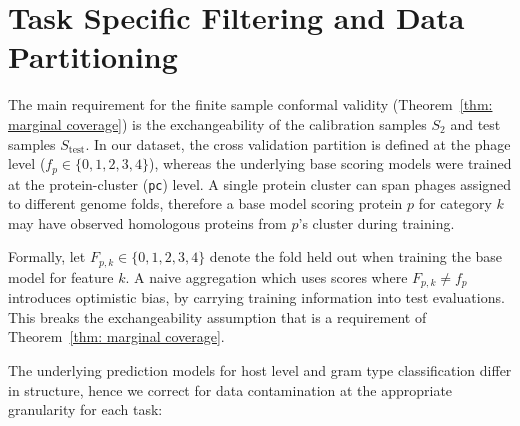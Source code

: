 

\section{Task Specific Filtering and Data Partitioning}
\label{sec4.3: contamination fix}

The main requirement for the finite sample conformal validity (Theorem~\ref{thm: marginal coverage}) is the 
exchangeability of the calibration samples $S_2$ and test samples $S_{\text{test}}$. In our dataset, the cross validation 
partition is defined at the phage level ($f_p \in \{0,1,2,3,4\}$), whereas the underlying base scoring models 
were trained at the protein-cluster (\texttt{pc}) level. A single protein cluster can span phages assigned to different genome 
folds, therefore a base model scoring protein $p$ for category $k$ may have observed homologous proteins from $p$'s cluster 
during training.

Formally, let $F_{p,k} \in \{0,1,2,3,4\}$ denote the fold held out when training the base model for feature $k$. A naive 
aggregation which uses scores where $F_{p,k} \neq f_p$ introduces optimistic bias, by carrying training information into test 
evaluations. This breaks the exchangeability assumption that is a requirement of Theorem~\ref{thm: marginal coverage}.

The underlying prediction models for host level and gram type classification differ in structure, hence we correct for data 
contamination at the appropriate granularity for each task:

